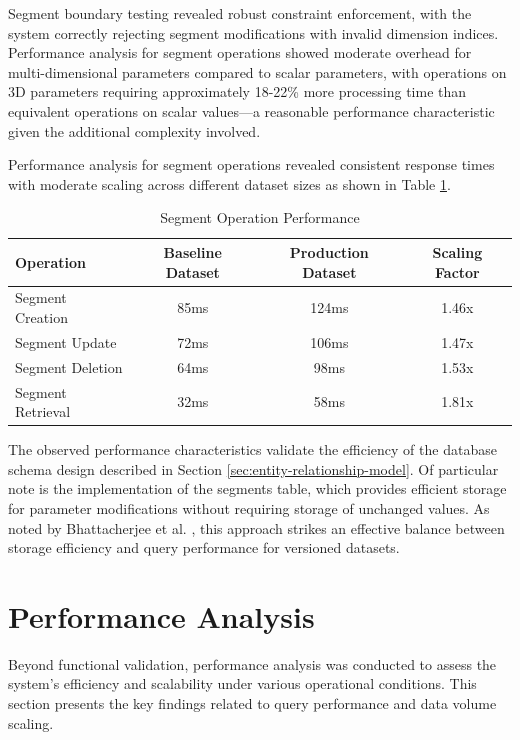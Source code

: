 Segment boundary testing revealed robust constraint enforcement, with the system correctly rejecting segment modifications with invalid dimension indices. Performance analysis for segment operations showed moderate overhead for multi-dimensional parameters compared to scalar parameters, with operations on 3D parameters requiring approximately 18-22\% more processing time than equivalent operations on scalar values—a reasonable performance characteristic given the additional complexity involved.

Performance analysis for segment operations revealed consistent response times with moderate scaling across different dataset sizes as shown in Table \ref{tab:segment-performance}.

\begin{table}[h]
\centering
\caption{Segment Operation Performance}
\label{tab:segment-performance}
\begin{tabular}{|l|c|c|c|}
\hline
\textbf{Operation} & \textbf{Baseline Dataset} & \textbf{Production Dataset} & \textbf{Scaling Factor} \\
\hline
Segment Creation & 85ms & 124ms & 1.46x \\
\hline
Segment Update & 72ms & 106ms & 1.47x \\
\hline
Segment Deletion & 64ms & 98ms & 1.53x \\
\hline
Segment Retrieval & 32ms & 58ms & 1.81x \\
\hline
\end{tabular}
\end{table}

The observed performance characteristics validate the efficiency of the database schema design described in Section \ref{sec:entity-relationship-model}. Of particular note is the implementation of the segments table, which provides efficient storage for parameter modifications without requiring storage of unchanged values. As noted by Bhattacherjee et al. \cite{bhattacherjee2015principles}, this approach strikes an effective balance between storage efficiency and query performance for versioned datasets.

\section{Performance Analysis}
\label{sec:performance-analysis}

Beyond functional validation, performance analysis was conducted to assess the system's efficiency and scalability under various operational conditions. This section presents the key findings related to query performance and data volume scaling.

